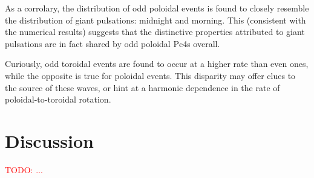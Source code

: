 \documentclass{article}
\newcommand{\todo}[1]{ \textcolor{red}{TODO: #1} }
\begin{document}
As a corrolary, the distribution of odd poloidal events is found to
closely resemble the distribution of giant pulsations: midnight and
morning. This (consistent with the numerical results) suggests that the
distinctive properties attributed to giant pulsations are in fact shared
by odd poloidal Pc4s overall.

Curiously, odd toroidal events are found to occur at a higher rate than
even ones, while the opposite is true for poloidal events. This
disparity may offer clues to the source of these waves, or hint at a
harmonic dependence in the rate of poloidal-to-toroidal rotation.




\section{Discussion}

\todo{...}






\end{document}
